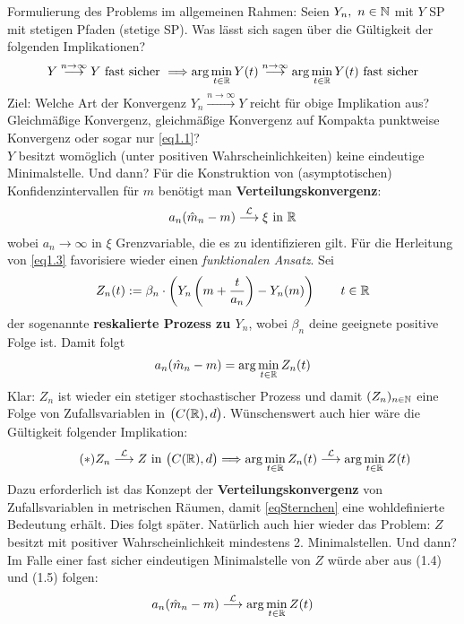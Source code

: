 Formulierung des Problems im allgemeinen Rahmen:
Seien $Y_n,~n\in\mathbb{N}$ mit $Y$ SP mit stetigen Pfaden (stetige SP).
Was lässt sich sagen über die Gültigkeit der folgenden Implikationen?
\begin{align}
	Y
	\stackrel{n\to\infty}{\longrightarrow}
	Y\text{ fast sicher }
	\Longrightarrow
	\arg\min\limits_{t\in\mathbb{R}} Y(t)
	\stackrel{n\to\infty}{\longrightarrow}
	\arg\min\limits_{t\in\mathbb{R}} Y(t)\text{ fast sicher}
\end{align}
Ziel: Welche Art der Konvergenz $Y_n\stackrel{n\to\infty}{\longrightarrow} Y$ reicht für obige Implikation aus? Gleichmäßige Konvergenz, gleichmäßige Konvergenz auf Kompakta punktweise Konvergenz oder sogar nur \eqref{eq1.1}?\\
$Y$ besitzt womöglich (unter positiven Wahrscheinlichkeiten) keine eindeutige Minimalstelle. Und dann?\nl
Für die Konstruktion von (asymptotischen) Konfidenzintervallen für $m$ benötigt man \textbf{Verteilungskonvergenz}:
\begin{align}\label{eq1.3}
	a_n(\hat{m}_n-m)
	\stackrel{\mathcal{L}}{\longrightarrow}\xi\text{ in }\mathbb{R}
\end{align}
wobei $a_n\to\infty$ in $\xi$ Grenzvariable, die es zu identifizieren gilt. Für die Herleitung von \eqref{eq1.3} favorisiere wieder einen \textit{funktionalen Ansatz}. Sei
\begin{align*}
	Z_n(t):=\beta_n\cdot\left( Y_n\left(m+\frac{t}{a_n}\right)-Y_n(m)\right)\qquad t\in\mathbb{R}
\end{align*}
der sogenannte \textbf{reskalierte Prozess zu $Y_n$}, wobei $\beta_n$ deine geeignete positive Folge ist. Damit folgt
\begin{align}\label{1.4}
	a_n(\hat{m}_n-m)=\arg\min\limits_{t\in\mathbb{R}} Z_n(t)
\end{align}
Klar: $Z_n$ ist wieder ein stetiger stochastischer Prozess und damit $(Z_n)_{n\in\mathbb{N}}$ eine Folge von Zufallsvariablen in $\big(C(\mathbb{R}),d\big)$.
Wünschenswert auch hier wäre die Gültigkeit folgender Implikation:
\begin{align}\label{eqSternchen}\tag{$\ast$}
	Z_n
	\stackrel{\mathcal{L}}{\longrightarrow}
	Z\text{ in } \big(C(\mathbb{R}),d\big)
	\Longrightarrow
	\arg\min\limits_{t\in\mathbb{R}} Z_n(t)
	\stackrel{\mathcal{L}}{\longrightarrow}
	\arg\min\limits_{t\in\mathbb{R}} Z(t)
\end{align}
Dazu erforderlich ist das Konzept der \textbf{Verteilungskonvergenz} von Zufallsvariablen in metrischen Räumen, damit \eqref{eqSternchen} eine wohldefinierte Bedeutung erhält.
Dies folgt später.
Natürlich auch hier wieder das Problem: $Z$ besitzt mit positiver Wahrscheinlichkeit mindestens 2. Minimalstellen. 
Und dann?\nl
Im Falle einer fast sicher eindeutigen Minimalstelle von $Z$ würde aber aus (1.4) und (1.5) folgen:
\begin{align*}
	a_n(\hat{m}_n-m)
	\stackrel{\mathcal{L}}{\longrightarrow}
	\arg\min\limits_{t\in\mathbb{R}} Z(t)
\end{align*}

